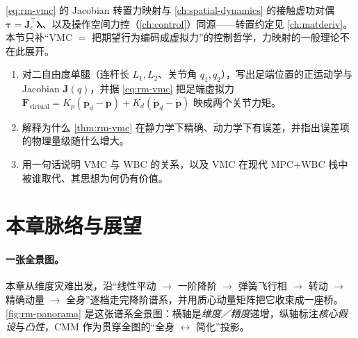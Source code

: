 \begin{note}
\cref{eq:rm-vmc} 的 Jacobian 转置力映射与 \cref{ch:spatial-dynamics} 的接触虚功对偶 $\boldsymbol{\tau}=\mathbf{J}_c^\top\boldsymbol{\lambda}$、以及操作空间力控（\cref{ch:control}）同源——转置约定见 \cref{ch:matderiv}。本节只补“VMC $=$ 把期望行为编码成虚拟力”的控制哲学，力映射的一般理论不在此展开。
\end{note}

\begin{exercise}
\begin{enumerate}
  \item 对二自由度单腿（连杆长 $L_1,L_2$、关节角 $q_1,q_2$），写出足端位置的正运动学与 Jacobian $\mathbf{J}(q)$，并据 \cref{eq:rm-vmc} 把足端虚拟力 $\mathbf{F}_{\mathrm{virtual}}=K_p(\mathbf{p}_d-\mathbf{p})+K_d(\dot{\mathbf{p}}_d-\dot{\mathbf{p}})$ 映成两个关节力矩。
  \item 解释为什么 \cref{thm:rm-vmc} 在静力学下精确、动力学下有误差，并指出误差项的物理量级随什么增大。
  \item 用一句话说明 VMC 与 WBC 的关系，以及 VMC 在现代 MPC$+$WBC 栈中被谁取代、其思想为何仍有价值。
\end{enumerate}
\end{exercise}

\section{本章脉络与展望}
\label{sec:rm-outlook}

\paragraph{一张全景图。}
本章从维度灾难出发，沿“线性平动 $\to$ 一阶降阶 $\to$ 弹簧飞行相 $\to$ 转动 $\to$ 精确动量 $\to$ 全身”逐档走完降阶谱系，并用质心动量矩阵把它收束成一座桥。\cref{fig:rm-panorama} 是这张谱系全景图：横轴是\emph{维度／精度}递增，纵轴标注\emph{核心假设}与\emph{凸性}，CMM 作为贯穿全图的“全身 $\leftrightarrow$ 简化”投影。

